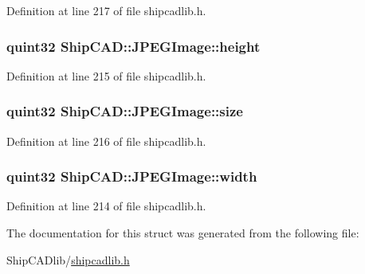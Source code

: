 Definition at line 217 of file shipcadlib.\+h.

\subsubsection[{\texorpdfstring{height}{height}}]{\setlength{\rightskip}{0pt plus 5cm}quint32 Ship\+C\+A\+D\+::\+J\+P\+E\+G\+Image\+::height}\hypertarget{structShipCAD_1_1JPEGImage_a35650ffa91785a63ba6f31cd87e208a2}{}\label{structShipCAD_1_1JPEGImage_a35650ffa91785a63ba6f31cd87e208a2}


Definition at line 215 of file shipcadlib.\+h.

\subsubsection[{\texorpdfstring{size}{size}}]{\setlength{\rightskip}{0pt plus 5cm}quint32 Ship\+C\+A\+D\+::\+J\+P\+E\+G\+Image\+::size}\hypertarget{structShipCAD_1_1JPEGImage_a7e28010a6fb1d0c2926f8381b2e29931}{}\label{structShipCAD_1_1JPEGImage_a7e28010a6fb1d0c2926f8381b2e29931}


Definition at line 216 of file shipcadlib.\+h.

\subsubsection[{\texorpdfstring{width}{width}}]{\setlength{\rightskip}{0pt plus 5cm}quint32 Ship\+C\+A\+D\+::\+J\+P\+E\+G\+Image\+::width}\hypertarget{structShipCAD_1_1JPEGImage_aef2620e748540276be24c0275620870b}{}\label{structShipCAD_1_1JPEGImage_aef2620e748540276be24c0275620870b}


Definition at line 214 of file shipcadlib.\+h.



The documentation for this struct was generated from the following file\+:\begin{DoxyCompactItemize}
\item 
Ship\+C\+A\+Dlib/\hyperlink{shipcadlib_8h}{shipcadlib.\+h}\end{DoxyCompactItemize}
